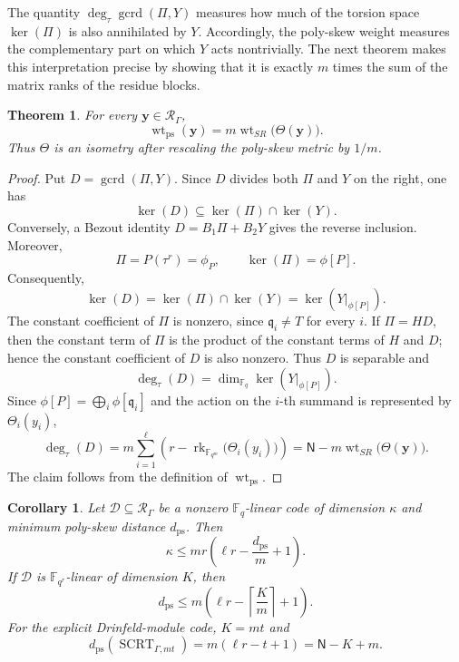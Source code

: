 \documentclass[10pt,a4paper]{amsart}
\DeclareMathOperator{\rk}{rk}
\DeclareMathOperator{\wt}{wt}
\theoremstyle{definition}
\theoremstyle{plain}
\newtheorem{theorem}[definition]{Theorem}
\newtheorem{corollary}[definition]{Corollary}
\theoremstyle{remark}
\newcommand{\vF}{\mathbb F}
\begin{document}
The quantity $\deg_\tau\operatorname{gcrd}(\Pi,Y)$ measures how much of the
torsion space $\ker(\Pi)$ is also annihilated by $Y$. Accordingly, the
poly-skew weight measures the complementary part on which $Y$ acts
nontrivially. The next theorem makes this interpretation precise by showing
that it is exactly $m$ times the sum of the matrix ranks of the residue
blocks.

\begin{theorem}
\label{thm:poly-skew-sum-rank-isometry}
For every $\boldsymbol y\in\mathcal R_\Gamma$,
$$
\wt_{\mathrm{ps}}(\boldsymbol y)
=
m\wt_{SR}\bigl(\Theta(\boldsymbol y)\bigr).
$$
Thus $\Theta$ is an isometry after rescaling the poly-skew metric by $1/m$.
\end{theorem}

\begin{proof}
Put $D=\operatorname{gcrd}(\Pi,Y)$. Since $D$ divides both $\Pi$ and $Y$ on
the right, one has
$$
\ker(D)\subseteq\ker(\Pi)\cap\ker(Y).
$$
Conversely, a Bezout identity $D=B_1\Pi+B_2Y$ gives the reverse inclusion.
Moreover,
$$
\Pi=P(\tau^r)=\phi_P,
\qquad
\ker(\Pi)=\phi[P].
$$
Consequently,
$$
\ker(D)=\ker(\Pi)\cap\ker(Y)
=
\ker\left(Y|_{\phi[P]}\right).
$$
The constant coefficient of $\Pi$ is nonzero, since
$\mathfrak q_i\neq T$ for every $i$. If $\Pi=HD$, then the constant term of
$\Pi$ is the product of the constant terms of $H$ and $D$; hence the constant
coefficient of $D$ is also nonzero. Thus $D$ is separable and
$$
\deg_\tau(D)
=
\dim_{\vF_q}\ker\left(Y|_{\phi[P]}\right).
$$
Since $\phi[P]=\bigoplus_i\phi[\mathfrak q_i]$ and the action on the $i$-th
summand is represented by $\Theta_i(y_i)$,
$$
\deg_\tau(D)
=
m\sum_{i=1}^{\ell}
\left(r-\rk_{\vF_{q^m}}\bigl(\Theta_i(y_i)\bigr)\right)
=
\mathsf N-m\wt_{SR}\bigl(\Theta(\boldsymbol y)\bigr).
$$
The claim follows from the definition of $\wt_{\mathrm{ps}}$.
\end{proof}

\begin{corollary}
Let $\mathcal D\subseteq\mathcal R_\Gamma$ be a nonzero $\vF_q$-linear code
of dimension $\kappa$ and minimum poly-skew distance $d_{\mathrm{ps}}$.
Then
$$
\kappa
\leq
mr\left(\ell r-\frac{d_{\mathrm{ps}}}{m}+1\right).
$$
If $\mathcal D$ is $\vF_{q^r}$-linear of dimension $K$, then
$$
d_{\mathrm{ps}}
\leq
m\left(\ell r-\left\lceil\frac{K}{m}\right\rceil+1\right).
$$
For the explicit Drinfeld-module code, $K=mt$ and
$$
d_{\mathrm{ps}}\left(\operatorname{SCRT}_{\Gamma,mt}\right)
=
m(\ell r-t+1)
=
\mathsf N-K+m.
$$
\end{corollary}
\end{document}
